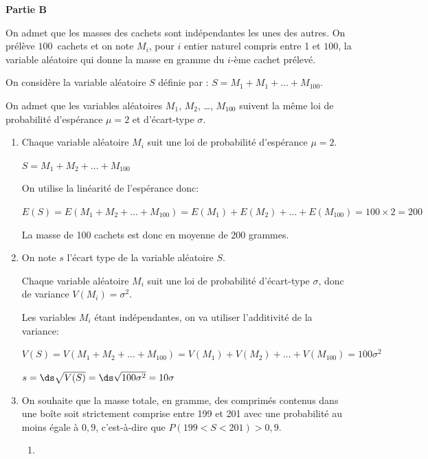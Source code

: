 \begin{center}
	\textbf{Partie B}
\end{center}

On admet que les masses des cachets sont indépendantes les unes des autres. On prélève 
$100$~cachets et on note $M_i$, pour $i$ entier naturel compris entre 1 et $100$, la variable aléatoire qui donne la masse en gramme du $i$-ème cachet prélevé.



On considère la variable aléatoire $S$ définie par :
$ S= M_1+ M_1+ \ldots+ M_{100}.$

On admet que les variables aléatoires $M_1$,\: $M_2$,\: \ldots,\: $M_{100}$ suivent la même loi de probabilité d'espérance $\mu = 2$ et d'écart-type $\sigma$.

\begin{enumerate}
	\item Chaque variable aléatoire $M_i$ suit une loi de probabilité d'espérance $\mu=2$.
	
$ S= M_1+ M_2+ \ldots+ M_{100}$

On utilise la linéarité de l'espérance donc:

$E(S) = E \left (M_1+ M_2+ \ldots+ M_{100} \right )
= E \left (M_1\right ) + E\left (M_2\right) + \ldots+ E\left (M_{100} \right)
= 100 \times 2 = 200$
	


La masse de 100 cachets est donc en moyenne de 200 grammes.

	\item On note $s$ l'écart type de la variable aléatoire $S$.
	
Chaque variable aléatoire $M_i$ suit une loi de probabilité d'écart-type $\sigma$, donc de variance $V\left (M_i\right ) = \sigma^2$.
	
Les variables $M_i$ étant indépendantes, on va utiliser l'additivité de la variance:

$V(S) = V \left (M_1+ M_2+ \ldots+ M_{100} \right )
= V \left (M_1\right ) + V\left (M_2\right )+ \ldots+ V\left (M_{100} \right )
= 100 \sigma^2$

$s = \ds\sqrt{V(S)} = \ds\sqrt{100 \sigma^2}=10\sigma$


	\item On souhaite que la masse totale, en gramme, des comprimés contenus dans une boîte soit strictement comprise entre 199 et 201 avec une probabilité au moins égale à $0,9$, c'est-à-dire que $P(199<S<201) > 0,9$.
	\begin{enumerate}
		\item 


\end{enumerate}
\end{enumerate}
